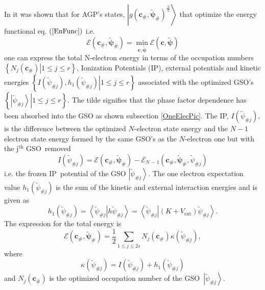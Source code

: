 \documentclass[aps,preprint]{revtex4}%
\begin{document}
In \cite{OrtizWeiner2006} it was shown that for AGP's states, $\left\vert
g\left(  \boldsymbol{c}_{\#},\boldsymbol{\tilde{\psi}}_{\#}\right)  ^{\frac
{N}{2}}\right\rangle $ that optimize the energy functional eq. $\left(
\ref{EnFunc}\right)  $ i.e.
\begin{equation}
\mathcal{E}\left(  \boldsymbol{c}_{\#},\boldsymbol{\tilde{\psi}}_{\#}\right)
=\min_{\boldsymbol{c},\boldsymbol{\tilde{\psi}}}\mathcal{E}\left(
\boldsymbol{c},\boldsymbol{\tilde{\psi}}\right)
\end{equation}
one can express the total N-electron energy in terms of the occupation numbers
$\left\{  \left.  N_{j}\left(  \boldsymbol{c}_{\#}\right)  \right\vert 1\leq
j\leq r\right\}  $, Ionization Potentials (IP), external potentials and
kinetic energies $\left\{  \left.  I\left(  \tilde{\psi}_{\#j}\right)
,h_{1}\left(  \tilde{\psi}_{\#j}\right)  \right\vert 1\leq j\leq r\right\}  $
associated with the optimized GSO's $\left\{  \left.  \left\vert \tilde{\psi
}_{\#j}\right\rangle \right\vert 1\leq j\leq r\right\}  $. The tilde signifies
that the phase factor dependence has been absorbed into the GSO as shown
subsection \ref{OneElecPic}. The IP, $I\left(  \tilde{\psi}_{\#j}\right)  ,$
is the difference between the optimized $N$-electron state energy and the
$N-1$ electron state energy formed by the same GSO's as the $N$-electron one
but with the j$^{\text{th}}$ GSO\ removed
\begin{equation}
I\left(  \tilde{\psi}_{\#j}\right)  =\mathcal{E}\left(  \boldsymbol{c}%
_{\#},\boldsymbol{\tilde{\psi}}_{\#}\right)  -\mathcal{E}_{N\,-1}\left(
\boldsymbol{c}_{\#},\boldsymbol{\tilde{\psi}}_{\#}\boldsymbol{,}\tilde{\psi
}_{\#j}\right)
\end{equation}
i.e. the frozen IP\ potential of the GSO $\left\vert \tilde{\psi}%
_{\#j}\right\rangle $. The one electron expectation value $h_{1}\left(
\tilde{\psi}_{\#j}\right)  $ is the sum of the kinetic and external
interaction energies and is given as
\begin{equation}
h_{1}\left(  \tilde{\psi}_{\#j}\right)  =\left\langle \left.  \tilde{\psi
}_{\#j}\right\vert h\tilde{\psi}_{\#j}\right\rangle =\left\langle \left.
\tilde{\psi}_{\#j}\right\vert \left(  K+V_{\text{ext}}\right)  \tilde{\psi
}_{\#j}\right\rangle .
\end{equation}
The expression for the total energy is
\begin{equation}
\mathcal{E}\left(  \boldsymbol{c}_{\#},\boldsymbol{\tilde{\psi}}_{\#}\right)
=\frac{1}{2}\sum_{1\leq j\leq2s}N_{j}\left(  \boldsymbol{c}_{\#}\right)
\kappa\left(  \tilde{\psi}_{\#j}\right)  ,
\end{equation}
where
\begin{equation}
\kappa\left(  \tilde{\psi}_{\#j}\right)  =I\left(  \tilde{\psi}_{\#j}\right)
+h_{1}\left(  \tilde{\psi}_{\#j}\right)
\end{equation}
and $N_{j}\left(  \boldsymbol{c}_{\#}\right)  $ is the optimized occupation
number of the GSO\ $\left\vert \tilde{\psi}_{\#j}\right\rangle .$
\end{document}
